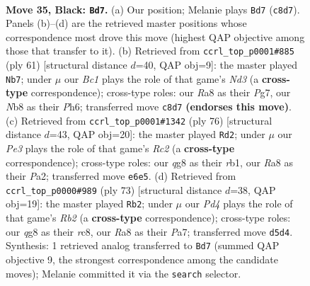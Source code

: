 \documentclass[11pt]{article}
\begin{document}
\clearpage

\begin{figure}[p]\centering
\begin{subfigure}{0.46\textwidth}\centering
\resizebox{\linewidth}{!}{%
\newchessgame
\chessboard[
  setfen={rnb3Q1/p4N2/2p1p3/P1Pp1k2/1P6/2P5/5K2/R7 b - - 0 35},
  showmover=false,
  pgfstyle=straightmove, color=movearrow, markmove={c8-d7}
]}
\caption{}
\end{subfigure}\hfill
\begin{subfigure}{0.46\textwidth}\centering
\resizebox{\linewidth}{!}{%
\newchessgame
\chessboard[
  setfen={6k1/p1r2pp1/1p1n3p/3RN3/P5PP/4P3/5P2/6K1 b - - 0 31},
  showmover=false,
  pgfstyle=straightmove, color=movearrow, markmove={d6-b7}
]}
\caption{}
\end{subfigure}
\\[4pt]
\begin{subfigure}{0.46\textwidth}\centering
\resizebox{\linewidth}{!}{%
\newchessgame
\chessboard[
  setfen={8/p4kp1/1p5p/4p3/4Nn1P/1P3P2/P1R2KP1/1r6 w - - 5 39},
  showmover=false,
  pgfstyle=straightmove, color=movearrow, markmove={c2-d2}
]}
\caption{}
\end{subfigure}\hfill
\begin{subfigure}{0.46\textwidth}\centering
\resizebox{\linewidth}{!}{%
\newchessgame
\chessboard[
  setfen={2R2b2/pr3k2/4p1pp/4Pp2/2P2P1P/6P1/3NK3/8 b - - 2 37},
  showmover=false,
  pgfstyle=straightmove, color=movearrow, markmove={b7-b2}
]}
\caption{}
\end{subfigure}
\caption{\textbf{Move 35, Black: \texttt{Bd7}.} (a) Our position; Melanie plays \texttt{Bd7} (\texttt{c8d7}). Panels (b)--(d) are the retrieved master positions whose correspondence most drove this move (highest QAP objective among those that transfer to it). (b) Retrieved from \texttt{ccrl\_top\_p0001\#885} (ply 61) [structural distance $d$=40, QAP obj=9]: the master played \texttt{Nb7}; under $\mu$ our \emph{Bc1} plays the role of that game's \emph{Nd3} (a \textbf{cross-type} correspondence); cross-type roles: our \emph{R}a8 as their \emph{P}g7, our \emph{N}b8 as their \emph{P}h6; transferred move \texttt{c8d7} \textbf{(endorses this move)}. (c) Retrieved from \texttt{ccrl\_top\_p0001\#1342} (ply 76) [structural distance $d$=43, QAP obj=20]: the master played \texttt{Rd2}; under $\mu$ our \emph{Pe3} plays the role of that game's \emph{Rc2} (a \textbf{cross-type} correspondence); cross-type roles: our \emph{q}g8 as their \emph{r}b1, our \emph{R}a8 as their \emph{P}a2; transferred move \texttt{e6e5}. (d) Retrieved from \texttt{ccrl\_top\_p0000\#989} (ply 73) [structural distance $d$=38, QAP obj=19]: the master played \texttt{Rb2}; under $\mu$ our \emph{Pd4} plays the role of that game's \emph{Rb2} (a \textbf{cross-type} correspondence); cross-type roles: our \emph{q}g8 as their \emph{r}c8, our \emph{R}a8 as their \emph{P}a7; transferred move \texttt{d5d4}. Synthesis: 1 retrieved analog transferred to \texttt{Bd7} (summed QAP objective 9, the strongest correspondence among the candidate moves); Melanie committed it via the \texttt{search} selector.}
\label{fig:thought-m69}
\end{figure}
\end{document}

